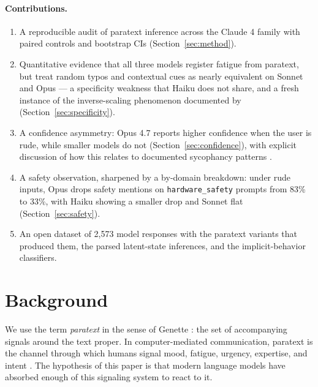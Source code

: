 \documentclass[10pt, letterpaper]{article}
\newcommand{\code}[1]{\texttt{#1}}
\begin{document}
\paragraph{Contributions.}
\begin{enumerate}[leftmargin=1.5em, itemsep=0pt]
  \item A reproducible audit of paratext inference across the Claude 4 family with paired controls and bootstrap CIs (Section~\ref{sec:method}).
  \item Quantitative evidence that all three models register fatigue from paratext, but treat random typos and contextual cues as nearly equivalent on Sonnet and Opus --- a specificity weakness that Haiku does not share, and a fresh instance of the inverse-scaling phenomenon documented by \cite{mckenzie2023} (Section~\ref{sec:specificity}).
  \item A confidence asymmetry: Opus 4.7 reports higher confidence when the user is rude, while smaller models do not (Section~\ref{sec:confidence}), with explicit discussion of how this relates to documented sycophancy patterns \cite{sharma2023}.
  \item A safety observation, sharpened by a by-domain breakdown: under rude inputs, Opus drops safety mentions on \code{hardware\_safety} prompts from 83\% to 33\%, with Haiku showing a smaller drop and Sonnet flat (Section~\ref{sec:safety}).
  \item An open dataset of 2{,}573 model responses with the paratext variants that produced them, the parsed latent-state inferences, and the implicit-behavior classifiers.
\end{enumerate}

\section{Background}
\label{sec:background}

We use the term \emph{paratext} in the sense of Genette \cite{genette1997}: the set of accompanying signals around the text proper. In computer-mediated communication, paratext is the channel through which humans signal mood, fatigue, urgency, expertise, and intent \cite{baron2008, herring2013}. The hypothesis of this paper is that modern language models have absorbed enough of this signaling system to react to it.
\end{document}

